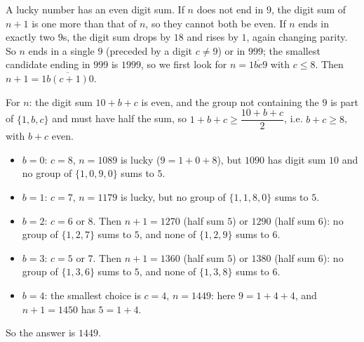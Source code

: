 A lucky number has an even digit sum. If $n$ does not end in $9$, the digit sum of $n+1$ is one more than that of $n$, so they cannot both be even. If $n$ ends in exactly two $9$s, the digit sum drops by $18$ and rises by $1$, again changing parity. So $n$ ends in a single $9$ (preceded by a digit $c\ne9$) or in $999$; the smallest candidate ending in $999$ is $1999$, so we first look for $n=\overline{1bc9}$ with $c\le8$. Then $n+1=\overline{1b(c+1)0}$.

For $n$: the digit sum $10+b+c$ is even, and the group not containing the $9$ is part of $\{1,b,c\}$ and must have half the sum, so $1+b+c\ge\dfrac{10+b+c}{2}$, i.e. $b+c\ge8$, with $b+c$ even.
\begin{itemize}
\item $b=0$: $c=8$, $n=1089$ is lucky ($9=1+0+8$), but $1090$ has digit sum $10$ and no group of $\{1,0,9,0\}$ sums to $5$.
\item $b=1$: $c=7$, $n=1179$ is lucky, but no group of $\{1,1,8,0\}$ sums to $5$.
\item $b=2$: $c=6$ or $8$. Then $n+1=1270$ (half sum $5$) or $1290$ (half sum $6$): no group of $\{1,2,7\}$ sums to $5$, and none of $\{1,2,9\}$ sums to $6$.
\item $b=3$: $c=5$ or $7$. Then $n+1=1360$ (half sum $5$) or $1380$ (half sum $6$): no group of $\{1,3,6\}$ sums to $5$, and none of $\{1,3,8\}$ sums to $6$.
\item $b=4$: the smallest choice is $c=4$, $n=1449$: here $9=1+4+4$, and $n+1=1450$ has $5=1+4$.
\end{itemize}
So the answer is $\boxed{1449}$.
